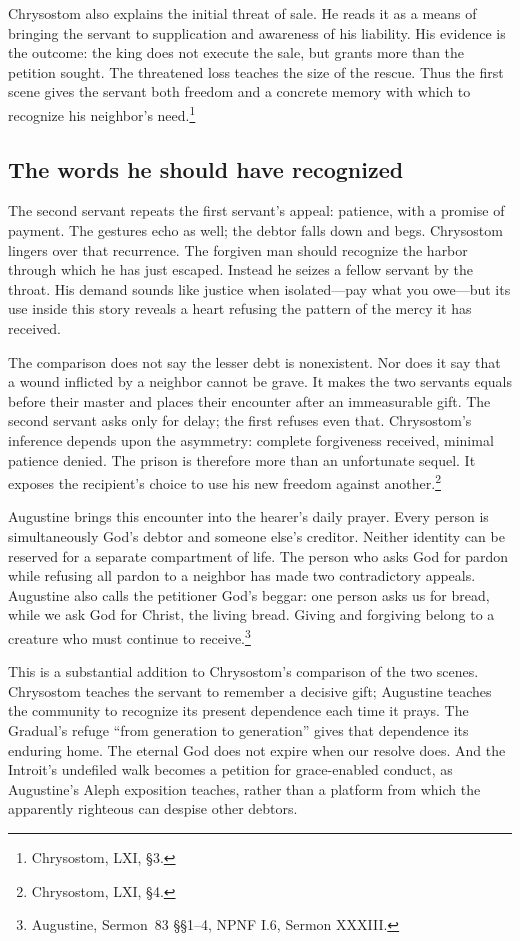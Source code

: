 Chrysostom also explains the initial threat of sale. He reads it as a
means of bringing the servant to supplication and awareness of his
liability. His evidence is the outcome: the king does not execute the
sale, but grants more than the petition sought. The threatened loss
teaches the size of the rescue. Thus the first scene gives the servant
both freedom and a concrete memory with which to recognize his
neighbor's need.\footnote{Chrysostom,  LXI, \S3.}

\subsection{The words he should have recognized}
The second servant repeats the first servant's appeal: patience, with
a promise of payment. The gestures echo as well; the debtor falls down
and begs. Chrysostom lingers over that recurrence. The forgiven man
should recognize the harbor through which he has just escaped. Instead
he seizes a fellow servant by the throat. His demand sounds like justice
when isolated---pay what you owe---but its use inside this story reveals
a heart refusing the pattern of the mercy it has received.

The comparison does not say the lesser debt is nonexistent. Nor does
it say that a wound inflicted by a neighbor cannot be grave. It makes
the two servants equals before their master and places their encounter
after an immeasurable gift. The second servant asks only for delay;
the first refuses even that. Chrysostom's inference depends upon the
asymmetry: complete forgiveness received, minimal patience denied.
The prison is therefore more than an unfortunate sequel. It exposes
the recipient's choice to use his new freedom against another.\footnote{Chrysostom,  LXI, \S4.}

Augustine brings this encounter into the hearer's daily prayer. Every
person is simultaneously God's debtor and someone else's creditor.
Neither identity can be reserved for a separate compartment of life.
The person who asks God for pardon while refusing all pardon to a
neighbor has made two contradictory appeals. Augustine also calls
the petitioner God's beggar: one person asks us for bread, while we
ask God for Christ, the living bread. Giving and forgiving belong to
a creature who must continue to receive.\footnote{Augustine,
Sermon~83 \S\S1--4, NPNF I.6, Sermon XXXIII.}

This is a substantial addition to Chrysostom's comparison of the two
scenes. Chrysostom teaches the servant to remember a decisive gift;
Augustine teaches the community to recognize its present dependence
each time it prays. The Gradual's refuge ``from generation to
generation'' gives that dependence its enduring home. The eternal God
does not expire when our resolve does. And the Introit's undefiled
walk becomes a petition for grace-enabled conduct, as Augustine's
Aleph exposition teaches, rather than a platform from which the
apparently righteous can despise other debtors.


